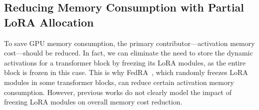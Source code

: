 \documentclass[sigconf]{acmart}
\begin{document}


\subsection{Reducing Memory Consumption with Partial LoRA Allocation}\label{subsec:lora-allocation}
%
%

To save GPU memory consumption, the primary contributor—activation memory cost—should be reduced. 
%
In fact, we can eliminate the need to store the dynamic activations for a transformer block by freezing its LoRA modules, as the entire block is frozen in this case. This is why FedRA~\cite{su2023fedra}, which randomly freezes LoRA modules in some transformer blocks, can reduce certain activation memory consumption. However, previous works do not clearly model the impact of freezing LoRA modules on overall memory cost reduction. 
\end{document}

